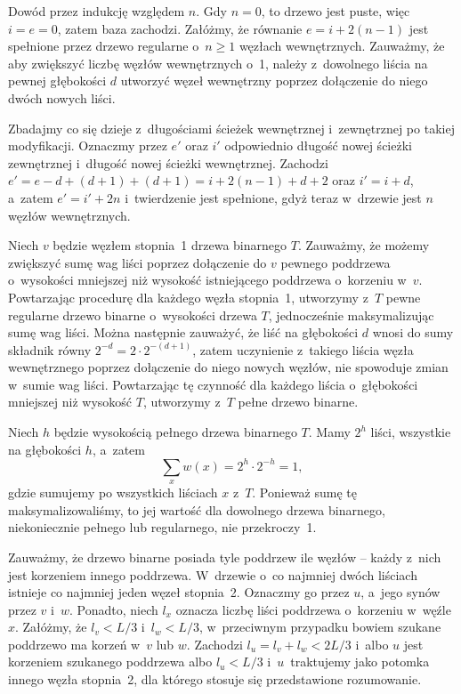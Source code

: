 \exercise %
Dowód przez indukcję względem $n$. Gdy $n=0$, to drzewo jest puste, więc $i=e=0$, zatem baza zachodzi. Załóżmy, że równanie $e=i+2(n-1)$ jest spełnione przez drzewo regularne o~$n\ge1$ węzłach wewnętrznych. Zauważmy, że aby zwiększyć liczbę węzłów wewnętrznych o~1, należy z~dowolnego liścia na pewnej głębokości $d$ utworzyć węzeł wewnętrzny poprzez dołączenie do niego dwóch nowych liści.

Zbadajmy co się dzieje z~długościami ścieżek wewnętrznej i~zewnętrznej po takiej modyfikacji. Oznaczmy przez $e'$ oraz $i'$ odpowiednio długość nowej ścieżki zewnętrznej i~długość nowej ścieżki wewnętrznej. Zachodzi $e'=e-d+(d+1)+(d+1)=i+2(n-1)+d+2$ oraz $i'=i+d$, a~zatem $e'=i'+2n$ i~twierdzenie jest spełnione, gdyż teraz w~drzewie jest $n$ węzłów wewnętrznych.

\exercise %
Niech $v$ będzie węzłem stopnia~1 drzewa binarnego $T$. Zauważmy, że możemy zwiększyć sumę wag liści poprzez dołączenie do $v$ pewnego poddrzewa o~wysokości mniejszej niż wysokość istniejącego poddrzewa o~korzeniu w~$v$. Powtarzając procedurę dla każdego węzła stopnia~1, utworzymy z~$T$ pewne regularne drzewo binarne o~wysokości drzewa $T$, jednocześnie maksymalizując sumę wag liści. Można następnie zauważyć, że liść na głębokości $d$ wnosi do sumy składnik równy $2^{-d}=2\cdot2^{-(d+1)}$, zatem uczynienie z~takiego liścia węzła wewnętrznego poprzez dołączenie do niego nowych węzłów, nie spowoduje zmian w~sumie wag liści. Powtarzając tę czynność dla każdego liścia o~głębokości mniejszej niż wysokość $T$, utworzymy z~$T$ pełne drzewo binarne.

Niech $h$ będzie wysokością pełnego drzewa binarnego $T$. Mamy $2^h$ liści, wszystkie na głębokości $h$, a~zatem
\[
	\sum_{x}w(x) = 2^h\cdot2^{-h} = 1,
\]
gdzie sumujemy po wszystkich liściach $x$ z~$T$. Ponieważ sumę tę maksymalizowaliśmy, to jej wartość dla dowolnego drzewa binarnego, niekoniecznie pełnego lub regularnego, nie przekroczy~1.

\exercise %

\noindent Zauważmy, że drzewo binarne posiada tyle poddrzew ile węzłów -- każdy z~nich jest korzeniem innego poddrzewa. W~drzewie o~co najmniej dwóch liściach istnieje co najmniej jeden węzeł stopnia~2. Oznaczmy go przez $u$, a~jego synów przez $v$ i~$w$. Ponadto, niech $l_x$ oznacza liczbę liści poddrzewa o~korzeniu w~węźle $x$. Załóżmy, że $l_v<L/3$ i~$l_w<L/3$, w~przeciwnym przypadku bowiem szukane poddrzewo ma korzeń w~$v$ lub $w$. Zachodzi $l_u=l_v+l_w<2L/3$ i~albo $u$ jest korzeniem szukanego poddrzewa albo $l_u<L/3$ i~$u$~traktujemy jako potomka innego węzła stopnia~2, dla którego stosuje się przedstawione rozumowanie.

